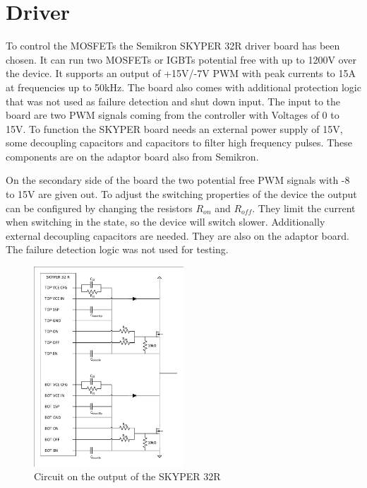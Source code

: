 \vspace{-8mm}
\section{Driver}\label{sec:driver}
\vspace{-3mm}
To control the MOSFETs the Semikron SKYPER 32R driver board has been chosen. \cite{Board1SK17:online} It can run two MOSFETs or IGBTs potential free with up to 1200V over the device.
It supports an output of +15V/-7V PWM with peak currents to 15A at frequencies up to 50kHz.
The board also comes with additional protection logic that was not used as failure detection and shut down input.
The input to the board are two PWM signals coming from the controller with Voltages of 0 to 15V.
To function the SKYPER board needs an external power supply of 15V,
some decoupling capacitors and capacitors to filter high frequency pulses.
These components are on the adaptor board also from Semikron.

On the secondary side of the board the two potential free PWM signals with -8 to 15V are given out.\cite{SKYPER322:online}
To adjust the switching properties of the device the output can be configured by changing the resistors $R_{on}$ and $R_{off}$.
They limit the current when switching in the state, so the device will switch slower.
Additionally external decoupling capacitors are needed. They are also on the adaptor board.
The failure detection logic was not used for testing.

\begin{figure}[H]
   \centering
   \includegraphics[width=0.5\textwidth]{figures/Skyperboard/Skyper32out.pdf}
    \caption{Circuit on the output of the SKYPER 32R}
	\label{fig:Skyper32out}
\end{figure}


